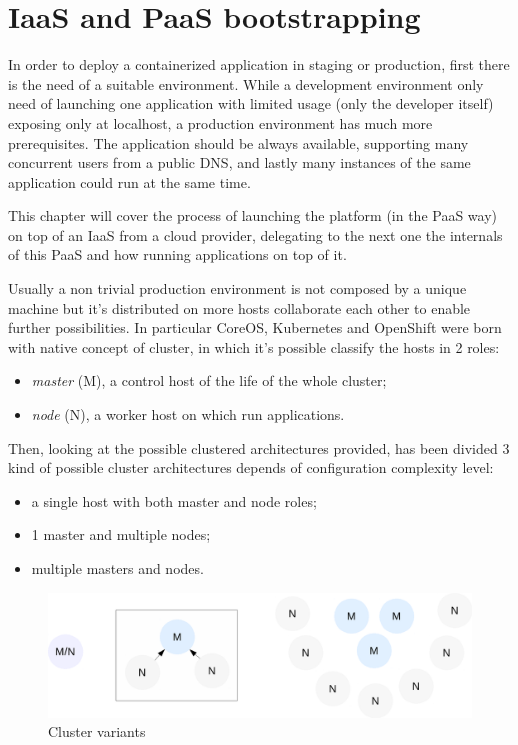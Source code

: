 \chapter{IaaS and PaaS bootstrapping}\label{iaas-and-paas-bootstrapping}

In order to deploy a containerized application in staging or production, first there is the need of a suitable environment.  While a development environment only need of launching one application with limited usage (only the developer itself) exposing only at localhost, a production environment has much more prerequisites.  The application should be always available, supporting many concurrent users from a public DNS, and lastly many instances of the same application could run at the same time.

This chapter will cover the process of launching the platform (in the PaaS way) on top of an IaaS from a cloud provider, delegating to the next one the internals of this PaaS and how running applications on top of it.

Usually a non trivial production environment is not composed by a unique machine but it's distributed on more hosts collaborate each other to enable further possibilities.  In particular CoreOS, Kubernetes and OpenShift were born with native concept of cluster, in which it's possible classify the hosts in 2 roles:
\begin{itemize}
\item \textit{master} (M), a control host of the life of the whole cluster;
\item \textit{node} (N), a worker host on which run applications.
\end{itemize}

Then, looking at the possible clustered architectures provided, has been divided 3 kind of possible cluster architectures depends of configuration complexity level:
\begin{itemize}
\item a single host with both master and node roles;
\item 1 master and multiple nodes;
\item multiple masters and nodes.
\end{itemize}

\begin{figure}[htbp]
\centering
\includegraphics{media/ch4-clusters.png}
\caption{Cluster variants}
\end{figure}

